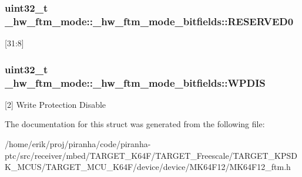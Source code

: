 \subsubsection[{\texorpdfstring{R\+E\+S\+E\+R\+V\+E\+D0}{RESERVED0}}]{\setlength{\rightskip}{0pt plus 5cm}uint32\+\_\+t \+\_\+hw\+\_\+ftm\+\_\+mode\+::\+\_\+hw\+\_\+ftm\+\_\+mode\+\_\+bitfields\+::\+R\+E\+S\+E\+R\+V\+E\+D0}\hypertarget{struct__hw__ftm__mode_1_1__hw__ftm__mode__bitfields_aa2f25d70b67ec604e99608fb54523cae}{}\label{struct__hw__ftm__mode_1_1__hw__ftm__mode__bitfields_aa2f25d70b67ec604e99608fb54523cae}
\mbox{[}31\+:8\mbox{]} 
\subsubsection[{\texorpdfstring{W\+P\+D\+IS}{WPDIS}}]{\setlength{\rightskip}{0pt plus 5cm}uint32\+\_\+t \+\_\+hw\+\_\+ftm\+\_\+mode\+::\+\_\+hw\+\_\+ftm\+\_\+mode\+\_\+bitfields\+::\+W\+P\+D\+IS}\hypertarget{struct__hw__ftm__mode_1_1__hw__ftm__mode__bitfields_a289c31438e0c931a1eb2740e291dd978}{}\label{struct__hw__ftm__mode_1_1__hw__ftm__mode__bitfields_a289c31438e0c931a1eb2740e291dd978}
\mbox{[}2\mbox{]} Write Protection Disable 

The documentation for this struct was generated from the following file\+:\begin{DoxyCompactItemize}
\item 
/home/erik/proj/piranha/code/piranha-\/ptc/src/receiver/mbed/\+T\+A\+R\+G\+E\+T\+\_\+\+K64\+F/\+T\+A\+R\+G\+E\+T\+\_\+\+Freescale/\+T\+A\+R\+G\+E\+T\+\_\+\+K\+P\+S\+D\+K\+\_\+\+M\+C\+U\+S/\+T\+A\+R\+G\+E\+T\+\_\+\+M\+C\+U\+\_\+\+K64\+F/device/device/\+M\+K64\+F12/M\+K64\+F12\+\_\+ftm.\+h\end{DoxyCompactItemize}
